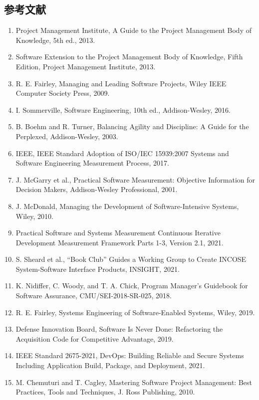 \documentclass[a4paper,11pt]{ltjsarticle}
\numberwithin{figure}{section}
\numberwithin{table}{section}
\begin{document}
\subsection{参考文献}
\begin{enumerate}[leftmargin=2em]
  \item Project Management Institute, A Guide to the Project Management Body of Knowledge, 5th ed., 2013.
  \item Software Extension to the Project Management Body of Knowledge, Fifth Edition, Project Management Institute, 2013.
  \item R. E. Fairley, Managing and Leading Software Projects, Wiley IEEE Computer Society Press, 2009.
  \item I. Sommerville, Software Engineering, 10th ed., Addison-Wesley, 2016.
  \item B. Boehm and R. Turner, Balancing Agility and Discipline: A Guide for the Perplexed, Addison-Wesley, 2003.
  \item IEEE, IEEE Standard Adoption of ISO/IEC 15939:2007 Systems and Software Engineering Measurement Process, 2017.
  \item J. McGarry et al., Practical Software Measurement: Objective Information for Decision Makers, Addison-Wesley Professional, 2001.
  \item J. McDonald, Managing the Development of Software-Intensive Systems, Wiley, 2010.
  \item Practical Software and Systems Measurement Continuous Iterative Development Measurement Framework Parts 1-3, Version 2.1, 2021.
  \item S. Sheard et al., “Book Club” Guides a Working Group to Create INCOSE System-Software Interface Products, INSIGHT, 2021.
  \item K. Nidiffer, C. Woody, and T. A. Chick, Program Manager’s Guidebook for Software Assurance, CMU/SEI-2018-SR-025, 2018.
  \item R. E. Fairley, Systems Engineering of Software-Enabled Systems, Wiley, 2019.
  \item Defense Innovation Board, Software Is Never Done: Refactoring the Acquisition Code for Competitive Advantage, 2019.
  \item IEEE Standard 2675-2021, DevOps: Building Reliable and Secure Systems Including Application Build, Package, and Deployment, 2021.
  \item M. Chemuturi and T. Cagley, Mastering Software Project Management: Best Practices, Tools and Techniques, J. Ross Publishing, 2010.
\end{enumerate}
\end{document}
